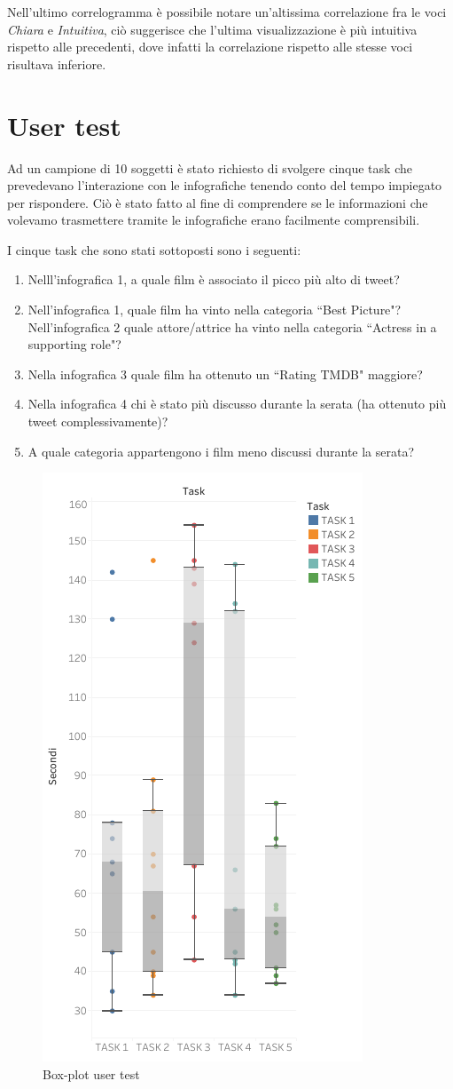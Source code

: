 Nell'ultimo correlogramma è possibile notare un'altissima correlazione fra le voci \textit{Chiara} e \textit{Intuitiva}, ciò suggerisce che l'ultima visualizzazione è più intuitiva rispetto alle precedenti, dove infatti la correlazione rispetto alle stesse voci risultava inferiore. 

\newpage
\section{User test}

Ad un campione di 10 soggetti è stato richiesto di svolgere cinque task che prevedevano l'interazione con le infografiche tenendo conto del tempo impiegato per rispondere. Ciò è stato fatto al fine di comprendere se le informazioni che volevamo trasmettere tramite le infografiche erano facilmente comprensibili.

I cinque task che sono stati sottoposti sono i seguenti: 
\begin{enumerate}
    \item Nelll'infografica 1, a quale film è associato il picco più alto di tweet?
    \item Nell'infografica  1, quale film ha vinto nella categoria “Best Picture"? Nell'infografica  2 quale attore/attrice ha vinto nella categoria “Actress in a supporting role"?
    \item Nella infografica 3 quale film ha ottenuto un “Rating TMDB" maggiore?
\item Nella infografica 4 chi è stato più discusso durante la serata (ha ottenuto più tweet complessivamente)?
\item A quale categoria appartengono i film meno discussi durante la serata?
\end{enumerate}
\begin{figure}[h]
			\centering
			\includegraphics[width=0.4\linewidth]{imgs/User test.png}
			\caption{Box-plot user test}
			\label{fig:Terza infografica111}
		\end{figure}

